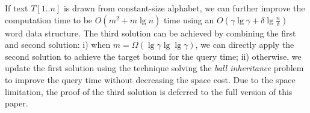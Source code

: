 \documentclass[smallabstract,smallcaptions]{dccpaper}
\newtheorem{theorem}{Theorem}
\begin{document}
	If text $T[1..n]$ is drawn from constant-size alphabet, we can further improve the computation time to be $O(m^2 + m\lg n)$ time using an $O(\gamma \lg \gamma + \delta \lg \frac{n}{\delta})$ word data structure.
	The third solution can be achieved by combining the first and second solution:
	i) when $m=\Omega(\lg \gamma \lg \lg \gamma)$, we can directly apply the second solution to achieve the target bound for the query time; ii) otherwise, we update the first solution using the technique solving the {\em ball inheritance} problem \cite{chan2011orthogonal} to improve the query time without decreasing the space cost.
	Due to the space limitation, the proof of the third solution is deferred to the full version of this paper.
\end{document}
